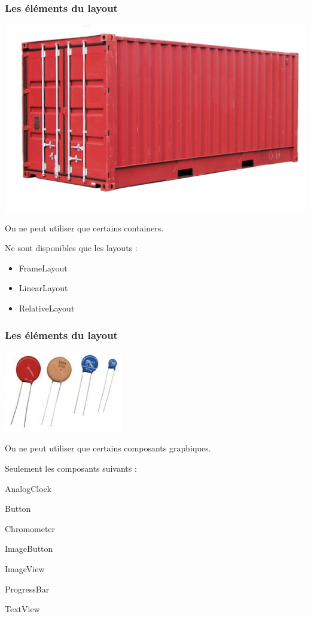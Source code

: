 \documentclass{beamer}
\begin{document}
\begin{frame}
\frametitle{Les éléments du layout}
\begin{center}
\includegraphics[scale=0.2]{container.jpg}
\end{center}
On ne peut utiliser que certains containers.
\begin{block}{Ne sont disponibles que les layouts :}
\begin{itemize}
\item FrameLayout
\item LinearLayout
\item RelativeLayout
\end{itemize}
\end{block}
\end{frame}

\begin{frame}
\frametitle{Les éléments du layout}
\begin{center}
\includegraphics[scale=0.5]{comps.png}
\end{center}
On ne peut utiliser que certains composants graphiques.
\begin{block}{Seulement les composants suivants :}
\begin{itemize}
\begin{minipage}[t]{0.4\linewidth}
\item AnalogClock
\item Button
\item Chromometer
\item ImageButton
\end{minipage}
\begin{minipage}[t]{0.4\linewidth}
\item ImageView
\item ProgressBar
\item TextView
\end{minipage}
\end{itemize}
\end{block}
\end{frame}
\end{document}
